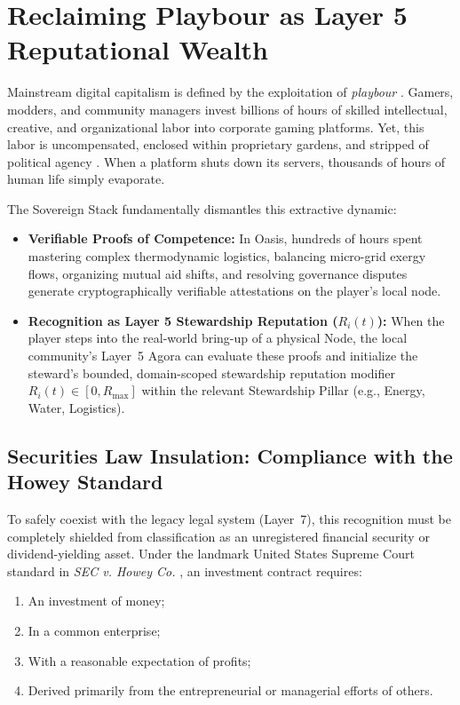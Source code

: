 \section{Reclaiming Playbour as Layer 5 Reputational Wealth}
\label{sec:playbour-reputation}

Mainstream digital capitalism is defined by the exploitation of \textit{playbour} \parencite{kucklich2005}. Gamers, modders, and community managers invest billions of hours of skilled intellectual, creative, and organizational labor into corporate gaming platforms. Yet, this labor is uncompensated, enclosed within proprietary gardens, and stripped of political agency \parencite{fisher2009,zuboff2019}. When a platform shuts down its servers, thousands of hours of human life simply evaporate.

The Sovereign Stack fundamentally dismantles this extractive dynamic:
\begin{itemize}
    \item \textbf{Verifiable Proofs of Competence:} In Oasis, hundreds of hours spent mastering complex thermodynamic logistics, balancing micro-grid exergy flows, organizing mutual aid shifts, and resolving governance disputes generate cryptographically verifiable attestations on the player's local node.
    \item \textbf{Recognition as Layer 5 Stewardship Reputation ($R_i(t)$):} When the player steps into the real-world bring-up of a physical Node, the local community's Layer~5 Agora can evaluate these proofs and initialize the steward's bounded, domain-scoped stewardship reputation modifier $R_i(t) \in [0, R_{\max}]$ within the relevant Stewardship Pillar (e.g., Energy, Water, Logistics).
\end{itemize}

\subsection{Securities Law Insulation: Compliance with the Howey Standard}
\label{sec:l10-howey}

To safely coexist with the legacy legal system (Layer~7), this recognition must be completely shielded from classification as an unregistered financial security or dividend-yielding asset. Under the landmark United States Supreme Court standard in \textit{SEC v. Howey Co.} \parencite{howey1946}, an investment contract requires:
\begin{enumerate}
    \item An investment of money;
    \item In a common enterprise;
    \item With a reasonable expectation of profits;
    \item Derived primarily from the entrepreneurial or managerial efforts of others.
\end{enumerate}

